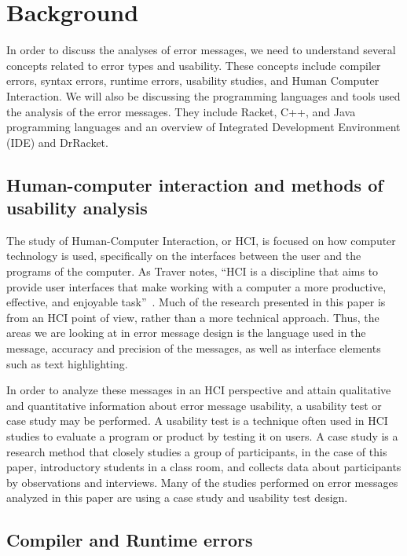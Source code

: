 \documentclass{sig-alternate}
\begin{document}
\section{Background}\label{sec:background}
In order to discuss the analyses of error messages, we need to understand several concepts related to error types and usability.
These concepts include compiler errors, syntax errors, runtime errors, usability studies, and Human Computer Interaction.
We will also be discussing the programming languages and tools used the analysis of the error messages.
They include Racket, C++, and Java programming languages and an overview of Integrated Development Environment (IDE) and DrRacket. 


\subsection{Human-computer interaction and methods of usability analysis}\label{subsec:hci}

The study of Human-Computer Interaction, or HCI, is focused on how computer technology is used, specifically on the interfaces between the user and the programs of the computer.
As Traver notes, ``HCI is a discipline that aims to provide user interfaces that make working with a computer a more productive, effective, and enjoyable task''~\cite{Traver:2010}.
Much of the research presented in this paper is from an HCI point of view, rather than a more technical approach.
Thus, the areas we are looking at in error message design is the language used in the message, accuracy and precision of the messages, as well as interface elements such as text highlighting.

In order to analyze these messages in an HCI perspective and attain qualitative and quantitative information about error message usability, a usability test or case study may be performed.
A usability test is a technique often used in HCI studies to evaluate a program or product by testing it on users.
A case study is a research method that closely studies a group of participants, in the case of this paper, introductory students in a class room, and collects data about participants by observations and interviews.
Many of the studies performed on error messages analyzed in this paper are using a case study and usability test design. 

\subsection{Compiler and Runtime errors}\label{subsec:error types}
\end{document}
